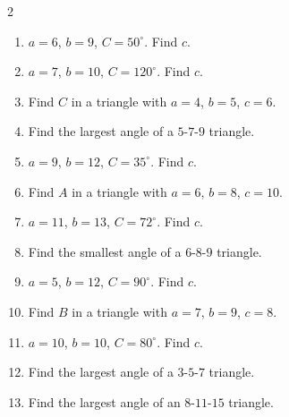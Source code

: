 \documentclass[11pt]{article}
\begin{document}
\begin{recapbox}
\begin{multicols}{2}
\small
\begin{enumerate}[leftmargin=*,itemsep=3pt]
  \item $a=6$, $b=9$, $C=50^\circ$. Find $c$.
  \item $a=7$, $b=10$, $C=120^\circ$. Find $c$.
  \item Find $C$ in a triangle with $a=4$, $b=5$, $c=6$.
  \item Find the largest angle of a $5$-$7$-$9$ triangle.
  \item $a=9$, $b=12$, $C=35^\circ$. Find $c$.
  \item Find $A$ in a triangle with $a=6$, $b=8$, $c=10$.
  \item $a=11$, $b=13$, $C=72^\circ$. Find $c$.
  \item Find the smallest angle of a $6$-$8$-$9$ triangle.
  \item $a=5$, $b=12$, $C=90^\circ$. Find $c$.
  \item Find $B$ in a triangle with $a=7$, $b=9$, $c=8$.
  \item $a=10$, $b=10$, $C=80^\circ$. Find $c$.
  \item Find the largest angle of a $3$-$5$-$7$ triangle.
  \item Find the largest angle of an $8$-$11$-$15$ triangle.
\end{enumerate}
\end{multicols}
\end{recapbox}
\end{document}
